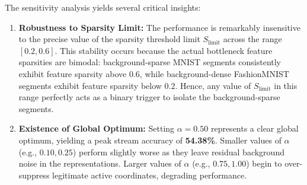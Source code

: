 \documentclass{article}
\theoremstyle{plain}
\theoremstyle{definition}
\theoremstyle{remark}
\begin{document}
The sensitivity analysis yields several critical insights:
\begin{enumerate}
    \item \textbf{Robustness to Sparsity Limit:} The performance is remarkably insensitive to the precise value of the sparsity threshold limit $S_{\text{limit}}$ across the range $[0.2, 0.6]$. This stability occurs because the actual bottleneck feature sparsities are bimodal: background-sparse MNIST segments consistently exhibit feature sparsity above $0.6$, while background-dense FashionMNIST segments exhibit feature sparsity below $0.2$. Hence, any value of $S_{\text{limit}}$ in this range perfectly acts as a binary trigger to isolate the background-sparse segments.
    \item \textbf{Existence of Global Optimum:} Setting $\alpha = 0.50$ represents a clear global optimum, yielding a peak stream accuracy of \textbf{54.38\%}. Smaller values of $\alpha$ (e.g., $0.10, 0.25$) perform slightly worse as they leave residual background noise in the representations. Larger values of $\alpha$ (e.g., $0.75, 1.00$) begin to over-suppress legitimate active coordinates, degrading performance.
\end{enumerate}
\end{document}
